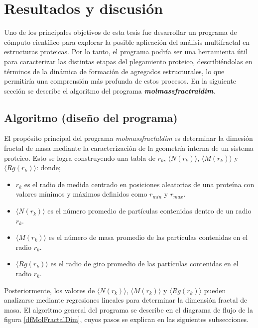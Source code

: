 \chapter{Resultados y discusión}

Uno de los principales objetivos de esta tesis fue desarrollar un programa de cómputo científico para explorar la posible aplicación del análisis multifractal en estructuras proteicas. Por lo tanto, el programa podría ser una herramienta útil para caracterizar las distintas etapas del plegamiento proteico, describiéndolas en términos de la dinámica de formación de agregados estructurales, lo que permitiría una comprensión más profunda de estos procesos. En la siguiente sección se describe el algoritmo del programa \textit{\textbf{molmassfractraldim}}. 
 
 
\section{Algoritmo (diseño del programa)}

El propósito principal del programa \textit{molmassfractaldim} es determinar la dimesi\'{o}n fractal de masa mediante la caracterizaci\'{o}n de la geometría interna de un sistema proteico. Esto se logra construyendo una tabla de $r_{k}$, $\langle N(r_k) \rangle$, $\langle M(r_k) \rangle$ y $\langle Rg(r_k) \rangle$: donde;

\begin{itemize}
	\item $r_{k}$ es el radio de medida centrado en posiciones aleatorias de una prote\'{i}na con valores m\'{i}nimos y m\'{a}ximos definidos como $r_{min}$ y $r_{max}$.
	\item $\langle N(r_k) \rangle$ es el número promedio de partículas contenidas dentro de un radio $r_{k}$. 
	\item  $\langle M(r_k) \rangle$ es el n\'{u}mero de masa promedio de las part\'{i}culas contenidas en el radio $r_{k}$.
	\item  $\langle Rg(r_k) \rangle$ es el radio de giro promedio de las part\'{i}culas contenidas en el radio $r_{k}$.
\end{itemize}

Posteriormente, los valores de $\langle N(r_k) \rangle$, $\langle M(r_k) \rangle$ y $\langle Rg(r_k) \rangle$ pueden analizarse mediante regresiones lineales para determinar la dimensi\'{o}n fractal de masa. El algoritmo general del programa se describe en el diagrama de flujo de la figura \ref{dfMolFractalDim}, cuyos pasos se explican en las siguientes subsecciones.
 
